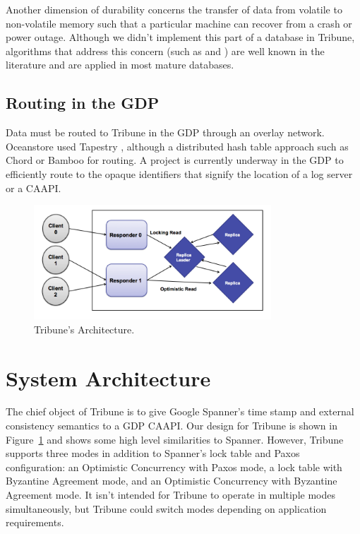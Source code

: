 \documentclass[10pt,twocolumn]{article}
\begin{document}
Another dimension of durability concerns the transfer of data from volatile to non-volatile memory such that a particular machine can recover from a crash or power outage. Although we didn't implement this part of a database in Tribune, algorithms that address this concern (such as \cite{mohan_aries:_1992} and \cite{sears_segment-based_2009} ) are well known in the literature and are applied in most mature databases.

\subsection{Routing in the GDP}
Data must be routed to Tribune in the GDP through an overlay network. Oceanstore used Tapestry \cite{zhao_tapestry_2004}, although a distributed hash table approach such as Chord \cite{stoica_chord:_2003} or Bamboo \cite{rhea_handling_2003} for routing. A project is currently underway in the GDP to efficiently route to the opaque identifiers that signify the location of a log server or a CAAPI.

\begin{figure}[!b]
  \begin{center}
    \includegraphics[width=3.5in]{Images/Tribune_Arch.png}
  \end{center}

  \caption{\small Tribune's Architecture. }
  \label{Tribune_Arch}
\end{figure}


\section{System Architecture}
The chief object of Tribune is to give Google Spanner's time stamp and external consistency semantics to a GDP CAAPI. Our design for Tribune is shown in Figure~\ref{Tribune_Arch} and shows some high level similarities to Spanner. However, Tribune supports three modes in addition to Spanner's lock table and Paxos configuration: an Optimistic Concurrency with Paxos mode, a lock table with Byzantine Agreement mode, and an Optimistic Concurrency with Byzantine Agreement mode. It isn't intended for Tribune to operate in multiple modes simultaneously, but Tribune could switch modes depending on application requirements. 
\end{document}

